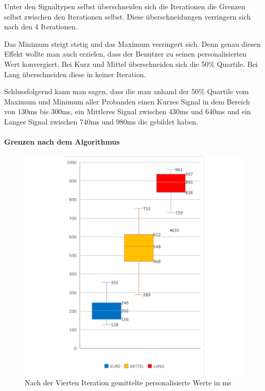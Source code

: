 
Unter den Signaltypen selbst {\"u}berschneiden sich die Iterationen die Grenzen selbst zwischen den Iterationen selbst. Diese {\"u}berschneidungen verringern sich nach den 4 Iterationen.

Das Minimum steigt stetig und das Maximum verringert sich. Denn genau diesen Effekt wollte man auch erzielen, dass der Benutzer zu seinen personalisierten Wert konvergiert.
Bei Kurz und Mittel {\"u}berschneiden sich die 50\% Quartile. Bei Lang {\"u}berschneiden diese in keiner Iteration.

Schlussfolgernd kann man sagen, dass die man anhand der 50\% Quartile vom Maximum und Minimum aller Probanden einen Kurzes Signal in dem Bereich von 130ms bis 300ms, ein Mittleres Signal zwischen 430ms und 640ms und ein Langes Signal zwischen 740ms und 980ms die gebildet haben. 


\paragraph{Grenzen nach dem Algorithmus}

\begin{figure}[htbp] 
            \centering
   	\includegraphics[width=\textwidth]{pics/analyse/algo/MinMax/GrenzenNachAlgo.png}
	\caption{Nach der Vierten Iteration gemittelte personalisierte Werte in ms}
	\label{fig:GrenzenNachAlgo}
\end{figure}

